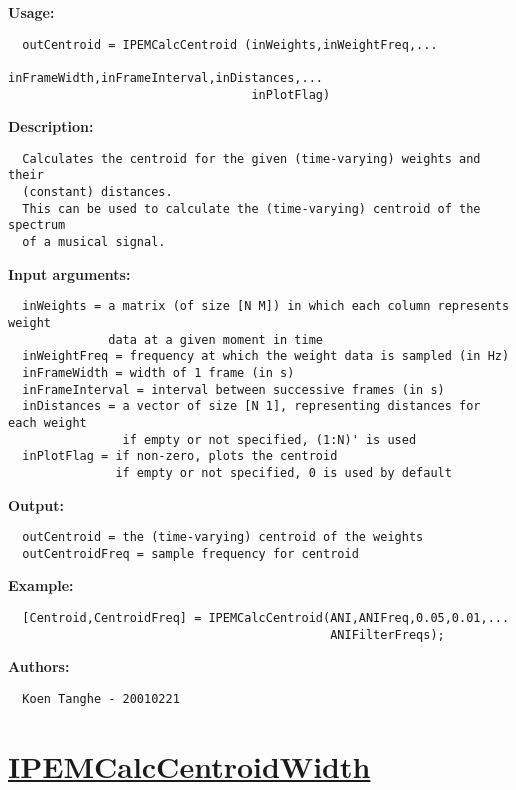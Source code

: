 \textbf{Usage:}
\begin{verbatim}  outCentroid = IPEMCalcCentroid (inWeights,inWeightFreq,...
                                  inFrameWidth,inFrameInterval,inDistances,...
                                  inPlotFlag)

\end{verbatim}
\textbf{Description:}
\begin{verbatim}  Calculates the centroid for the given (time-varying) weights and their
  (constant) distances.
  This can be used to calculate the (time-varying) centroid of the spectrum
  of a musical signal.

\end{verbatim}
\textbf{Input arguments:}
\begin{verbatim}  inWeights = a matrix (of size [N M]) in which each column represents weight
              data at a given moment in time
  inWeightFreq = frequency at which the weight data is sampled (in Hz)
  inFrameWidth = width of 1 frame (in s)
  inFrameInterval = interval between successive frames (in s)
  inDistances = a vector of size [N 1], representing distances for each weight
                if empty or not specified, (1:N)' is used
  inPlotFlag = if non-zero, plots the centroid
               if empty or not specified, 0 is used by default

\end{verbatim}
\textbf{Output:}
\begin{verbatim}  outCentroid = the (time-varying) centroid of the weights
  outCentroidFreq = sample frequency for centroid

\end{verbatim}
\textbf{Example:}
\begin{verbatim}  [Centroid,CentroidFreq] = IPEMCalcCentroid(ANI,ANIFreq,0.05,0.01,...
                                             ANIFilterFreqs);

\end{verbatim}
\textbf{Authors:}
\begin{verbatim}  Koen Tanghe - 20010221
\end{verbatim}


\newpage
\section*{\hyperlink{Concepts:IPEMCalcCentroidWidth}{IPEMCalcCentroidWidth}}
\hypertarget{FuncRef:IPEMCalcCentroidWidth}{}


